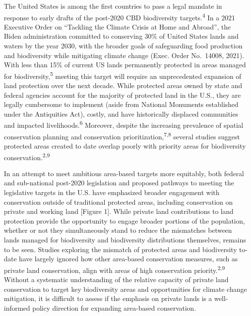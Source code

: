 \documentclass[3p]{elsarticle} %
\begin{document}
The United States is among the first countries to pass a legal mandate
in response to early drafts of the post-2020 CBD biodiversity
targets.\textsuperscript{4} In a 2021 Executive Order on ``Tackling the
Climate Crisis at Home and Abroad'', the Biden administration committed
to conserving 30\% of United States lands and waters by the year 2030,
with the broader goals of safeguarding food production and biodiversity
while mitigating climate change (Exec. Order No.~14008, 2021). With less
than 15\% of current US lands permanently protected in areas managed for
biodiversity,\textsuperscript{5} meeting this target will require an
unprecedented expansion of land protection over the next decade. While
protected areas owned by state and federal agencies account for the
majority of protected land in the U.S., they are legally cumbersome to
implement (aside from National Monuments established under the
Antiquities Act), costly, and have historically displaced communities
and impacted livelihoods.\textsuperscript{6} Moreover, despite the
increasing prevalence of spatial conservation planning and conservation
prioritization,\textsuperscript{7,8} several studies suggest protected
areas created to date overlap poorly with priority areas for
biodiversity conservation.\textsuperscript{2,9}

In an attempt to meet ambitious area-based targets more equitably, both
federal and sub-national post-2020 legislation and proposed pathways to
meeting the legislative targets in the U.S. have emphasized broader
engagement with conservation outside of traditional protected areas,
including conservation on private and working land {[}Figure 1{]}. While
private land contributions to land protection provide the opportunity to
engage broader portions of the population, whether or not they
simultaneously stand to reduce the mismatches between lands managed for
biodiversity and biodiversity distributions themselves, remains to be
seen. Studies exploring the mismatch of protected areas and biodiversity
to-date have largely ignored how other area-based conservation measures,
such as private land conservation, align with areas of high conservation
priority.\textsuperscript{2,9} Without a systematic understanding of the
relative capacity of private land conservation to target key
biodiversity areas and opportunities for climate change mitigation, it
is difficult to assess if the emphasis on private lands is a
well-informed policy direction for expanding area-based conservation.
\end{document}
